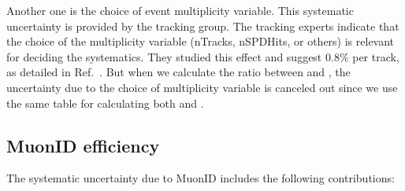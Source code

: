 Another one is the choice of event multiplicity variable.
This systematic uncertainty is provided by the tracking group. 
The tracking experts indicate that the choice of the multiplicity variable (nTracks, nSPDHits, or others) is relevant for deciding the systematics.
They studied this effect and suggest $0.8\%$ per track, as detailed in Ref.~\cite{Trackweb}.
But when we calculate the ratio between \jpsi and \psitwos, the uncertainty due to the choice of multiplicity variable is canceled out since we use 
the same table for calculating both \jpsi and \psitwos.


\subsection{MuonID efficiency}
\label{sec:MuonIDCalib}
The systematic uncertainty due to MuonID includes the following contributions:
